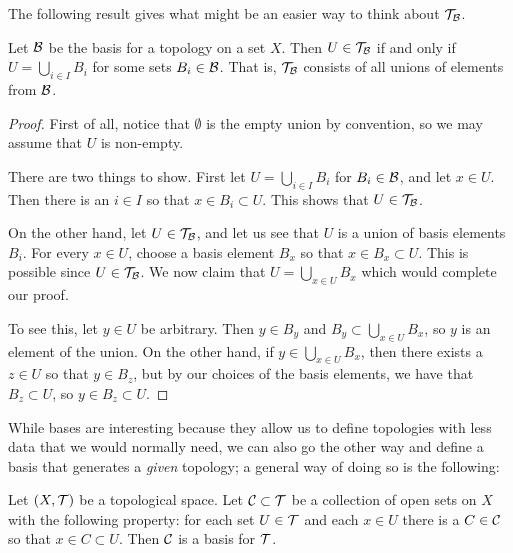 The following result gives what might be an easier way to think about $\mathcal{T}_{\mathcal{B}}$.
\begin{lem}
  \label{genereated-by-unions}
  Let $\mathcal{B}$ be the basis for a topology on a set $X$. Then $U \in \mathcal{T}_{\mathcal{B}}$ if and only if $U = \bigcup_{i \in I} B_i$ for some sets $B_i \in \mathcal{B}$. That is, $\mathcal{T}_{\mathcal{B}}$ consists of all unions of elements from $\mathcal{B}$.
\end{lem}
\begin{proof}
  First of all, notice that $\emptyset$ is the empty union by convention, so we may assume that $U$ is non-empty.

  There are two things to show. First let $U = \bigcup_{i \in I} B_i$ for $B_i \in \mathcal{B}$, and let $x \in U$. Then there is an $i \in I$ so that $x \in B_i \subset U$. This shows that $U \in \mathcal{T}_{\mathcal{B}}$.
  
  On the other hand, let $U \in \mathcal{T}_{\mathcal{B}}$, and let us see that $U$ is a union of basis elements $B_i$. For every $x \in U$, choose a basis element $B_x$ so that $x \in B_x \subset U$. This is possible since $U \in \mathcal{T}_{\mathcal{B}}$. We now claim that $U = \bigcup_{x \in U} B_x$ which would complete our proof.
  
  To see this, let $y \in U$ be arbitrary. Then $y \in B_y$ and $B_y \subset \bigcup_{x \in U} B_x$, so $y$ is an element of the union. On the other hand, if $y \in \bigcup_{x \in U} B_x$, then there exists a $z \in U$ so that $y \in B_z$, but by our choices of the basis elements, we have that $B_z \subset U$, so $y \in B_z \subset U$.
\end{proof}
While bases are interesting because they allow us to define topologies with less data that we would normally need, we can also go the other way and define a basis that generates a \emph{given} topology; a general way of doing so is the following:
\begin{lem}
  Let $(X,\mathcal{T})$ be a topological space. Let $\mathcal{C} \subset \mathcal{T}$ be a collection of open sets on $X$ with the following property: for each set $U \in \mathcal{T}$ and each $x \in U$ there is a $C \in \mathcal{C}$ so that $x \in C \subset U$. Then $\mathcal{C}$ is a basis for $\mathcal{T}$.
\end{lem}
